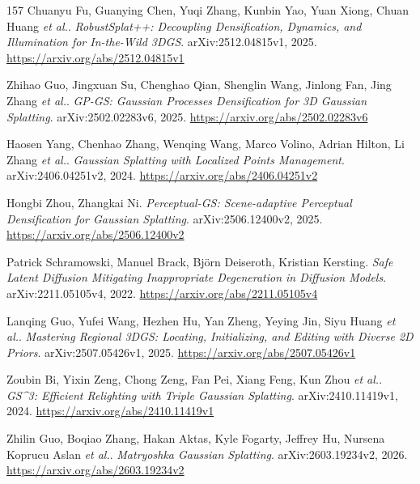 \documentclass[11pt,a4paper]{article}
\begin{document}
\begin{thebibliography}{157}
Chuanyu Fu, Guanying Chen, Yuqi Zhang, Kunbin Yao, Yuan Xiong, Chuan Huang \emph{et al.}.
\newblock \emph{RobustSplat++: Decoupling Densification, Dynamics, and Illumination for In-the-Wild 3DGS}.
\newblock arXiv:2512.04815v1, 2025.
\newblock \url{https://arxiv.org/abs/2512.04815v1}

Zhihao Guo, Jingxuan Su, Chenghao Qian, Shenglin Wang, Jinlong Fan, Jing Zhang \emph{et al.}.
\newblock \emph{GP-GS: Gaussian Processes Densification for 3D Gaussian Splatting}.
\newblock arXiv:2502.02283v6, 2025.
\newblock \url{https://arxiv.org/abs/2502.02283v6}

Haosen Yang, Chenhao Zhang, Wenqing Wang, Marco Volino, Adrian Hilton, Li Zhang \emph{et al.}.
\newblock \emph{Gaussian Splatting with Localized Points Management}.
\newblock arXiv:2406.04251v2, 2024.
\newblock \url{https://arxiv.org/abs/2406.04251v2}

Hongbi Zhou, Zhangkai Ni.
\newblock \emph{Perceptual-GS: Scene-adaptive Perceptual Densification for Gaussian Splatting}.
\newblock arXiv:2506.12400v2, 2025.
\newblock \url{https://arxiv.org/abs/2506.12400v2}

Patrick Schramowski, Manuel Brack, Bj\"{o}rn Deiseroth, Kristian Kersting.
\newblock \emph{Safe Latent Diffusion Mitigating Inappropriate Degeneration in Diffusion Models}.
\newblock arXiv:2211.05105v4, 2022.
\newblock \url{https://arxiv.org/abs/2211.05105v4}

Lanqing Guo, Yufei Wang, Hezhen Hu, Yan Zheng, Yeying Jin, Siyu Huang \emph{et al.}.
\newblock \emph{Mastering Regional 3DGS: Locating, Initializing, and Editing with Diverse 2D Priors}.
\newblock arXiv:2507.05426v1, 2025.
\newblock \url{https://arxiv.org/abs/2507.05426v1}

Zoubin Bi, Yixin Zeng, Chong Zeng, Fan Pei, Xiang Feng, Kun Zhou \emph{et al.}.
\newblock \emph{GS\textasciicircum{}3: Efficient Relighting with Triple Gaussian Splatting}.
\newblock arXiv:2410.11419v1, 2024.
\newblock \url{https://arxiv.org/abs/2410.11419v1}

Zhilin Guo, Boqiao Zhang, Hakan Aktas, Kyle Fogarty, Jeffrey Hu, Nursena Koprucu Aslan \emph{et al.}.
\newblock \emph{Matryoshka Gaussian Splatting}.
\newblock arXiv:2603.19234v2, 2026.
\newblock \url{https://arxiv.org/abs/2603.19234v2}


\end{thebibliography}
\end{document}
